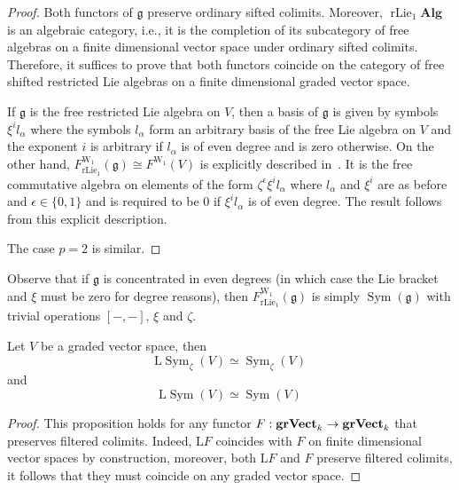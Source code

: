 \documentclass[AHL,Unicode,longabstracts,published]{cedram}
\DeclareMathOperator{\sym}{Sym}
\DeclareMathOperator{\rlie}{rLie}
\newcommand{\alg}{\mathbf{Alg}}
\newcommand{\grVect}{\mathbf{grVect}}
\renewcommand{\L}{\mathrm{L}}
\newcommand{\W}{\mathrm{W}}
\newcommand{\fkg}{\mathfrak{g}}
\renewcommand*{\to}{\mathchoice{\longrightarrow}{\rightarrow}{\rightarrow}{\rightarrow}}
\begin{document}
\begin{proof}
Both functors of $\fkg$ preserve ordinary sifted colimits. Moreover, $\rlie_1\alg$ is an algebraic category, i.e., it is the completion of its subcategory of free algebras on a finite dimensional vector space under ordinary sifted colimits. Therefore, it suffices to prove that both functors coincide on the category of free shifted restricted Lie algebras on a finite dimensional graded vector space.

If $\fkg$ is the free restricted Lie algebra on $V$, then a basis of $\fkg$ is given by symbols $\xi^il_\alpha$ where the symbols $l_\alpha$ form an arbitrary basis of the free Lie algebra on $V$ and the exponent $i$ is arbitrary if $l_\alpha$ is of even degree and is zero otherwise. On the other hand, $F_{\rlie_1}^{\W_1}(\fkg)\cong F^{\W_1}(V)$ is explicitly described in~\cite[p.~227]{cohenladamay}. It is the free commutative algebra on elements of the form $\zeta^\epsilon\xi^il_\alpha$ where $l_\alpha$ and $\xi^i$ are as before and $\epsilon\in\{0,1\}$ and is required to be $0$ if $\xi^il_\alpha$ is of even degree. The result follows from this explicit description.

The case $p=2$ is similar.
\end{proof}



\begin{rema}\label{rem : even degree}
Observe that if $\fkg$ is concentrated in even degrees (in which case the Lie bracket and $\xi$ must be zero for degree reasons), then $F_{\rlie_1}^{\W_1}(\fkg)$ is simply $\sym(\fkg)$ with trivial operations $[-,-]$, $\xi$ and $\zeta$.
\end{rema}



\begin{prop}\label{prop : free is derived}
Let $V$ be a graded vector space, then
\[
\L \sym_{\zeta}(V)\simeq \sym_{\zeta}(V)
\]
and
\[
\L \sym(V)\simeq \sym(V)
\]
\end{prop}

\begin{proof}
This proposition holds for any functor $F: \grVect_k\to\grVect_k$ that preserves filtered colimits. Indeed, $\L F$ coincides with $F$ on finite dimensional vector spaces by construction, moreover, both $\L F$ and $F$ preserve filtered colimits, it follows that they must coincide on any graded vector space.
\end{proof}
\end{document}
